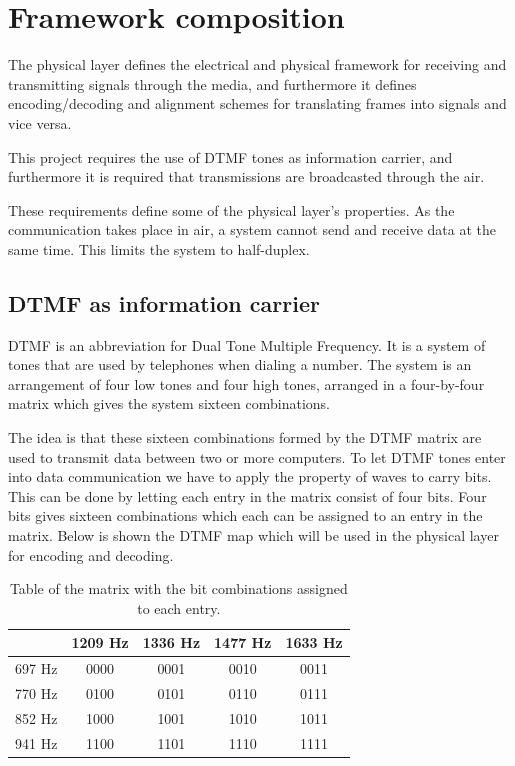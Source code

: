 \section{Framework composition}\label{sec:physical_analysis} 
The physical layer defines the electrical and physical framework for receiving and 
transmitting signals through the media, and furthermore it defines encoding/decoding 
and alignment schemes for translating frames into signals and vice versa.

This project requires the use of DTMF tones as information carrier, and furthermore it is
required that transmissions are broadcasted through the air. 

These requirements define some of the physical layer's properties. As the communication takes place in air, a system cannot  send and receive data at the same time. This limits the system to half-duplex.


	\subsection{DTMF as information carrier}
	DTMF is an abbreviation for Dual Tone Multiple Frequency. It is a system of tones that are used by
	telephones when dialing a number. The system is an arrangement of four low tones and four high tones,
	arranged in a four-by-four matrix which gives the system sixteen combinations.
	
	The idea is that these sixteen combinations formed by the DTMF matrix are used to transmit data
	between two or more computers. To let DTMF tones enter into data communication we have
	to apply the property of  waves to carry bits. This can be done by letting each entry in the matrix
	consist of four bits. Four bits gives sixteen combinations which each can be assigned to an entry in
	the matrix. Below is shown the DTMF map which will be used in the physical layer for encoding and decoding.
	
	\begin{table}[htb]
		\begin{center}
			\begin{tabular}{c|c c c c}
			 & 1209 Hz & 1336 Hz & 1477 Hz & 1633 Hz \\
			\hline
			697 Hz & 0000 & 0001 & 0010 & 0011 \\
			770 Hz & 0100 & 0101 & 0110 & 0111 \\
			852 Hz & 1000 & 1001 & 1010 & 1011 \\
			941 Hz & 1100 & 1101 & 1110 & 1111 \\
			\end{tabular}
		\end{center}
		\caption{Table of the matrix with the bit combinations assigned to each entry.}
		\label{tab:DTMF_mapping}
	\end{table}
	
